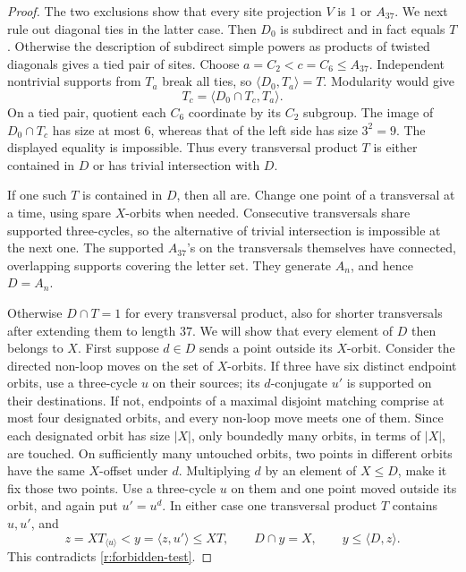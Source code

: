 \begin{proof}
The two exclusions show that every site projection $V$ is $1$ or
$A_{37}$.  We next rule out diagonal ties in the latter case.
Then $D_0$ is subdirect and in fact equals $T$.
Otherwise the description of subdirect simple powers as products of
twisted diagonals gives a tied pair of sites.  Choose
$a=C_2<c=C_6\le A_{37}$.  Independent nontrivial supports from
$T_a$ break all ties, so $\langle D_0,T_a\rangle=T$.
Modularity would give
\[
 T_c=\langle D_0\cap T_c,T_a\rangle.
\]
On a tied pair, quotient each $C_6$ coordinate by its $C_2$ subgroup.
The image of $D_0\cap T_c$ has size at most $6$, whereas that of the
left side has size $3^2=9$.  The displayed equality is impossible.
Thus every transversal product $T$ is either contained in $D$ or has
trivial intersection with $D$.

If one such $T$ is contained in $D$, then all are.  Change one point
of a transversal at a time, using spare $X$-orbits when needed.
Consecutive transversals share supported three-cycles, so the
alternative of trivial intersection is impossible at the next one.
The supported $A_{37}$'s on the transversals themselves have connected,
overlapping supports covering the letter set.  They generate $A_n$,
and hence $D=A_n$.

Otherwise $D\cap T=1$ for every transversal product, also for shorter
transversals after extending them to length $37$.  We will show that every
element of $D$ then belongs to $X$.  First suppose $d\in D$
sends a point outside its $X$-orbit.  Consider the directed non-loop
moves on the set of $X$-orbits.  If three have six distinct endpoint
orbits, use a three-cycle $u$ on their sources; its $d$-conjugate
$u'$ is supported on their destinations.  If not, endpoints of a
maximal disjoint matching comprise at most four designated orbits,
and every non-loop move meets one of them.  Since each designated
orbit has size $|X|$, only boundedly many orbits, in terms of $|X|$,
are touched.  On sufficiently many untouched orbits, two points in
different orbits have the same $X$-offset under $d$.  Multiplying $d$
by an element of $X\le D$, make it fix those two points.  Use a
three-cycle $u$ on them and one point moved outside its orbit, and
again put $u'=u^d$.  In either case one transversal product $T$
contains $u,u'$, and
\[
 z=XT_{\langle u\rangle}<y=\langle z,u'\rangle\le XT,
 \qquad D\cap y=X,\qquad y\le\langle D,z\rangle.
\]
This contradicts \eqref{r:forbidden-test}.


\end{proof}
